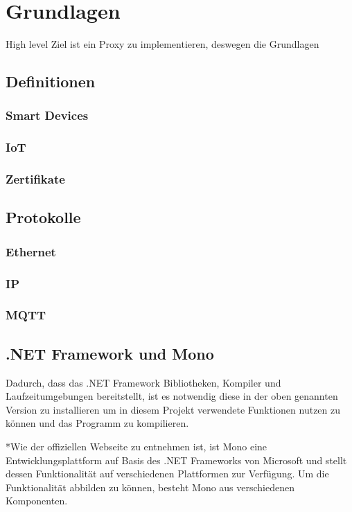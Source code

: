 \chapter{Grundlagen}
High level Ziel ist ein Proxy zu implementieren, deswegen die Grundlagen

\section{Definitionen}
    \subsection{Smart Devices}
    \subsection{IoT}
    \subsection{Zertifikate} %

\section{Protokolle}
    \subsection{Ethernet}
    \subsection{IP}
    \subsection{MQTT}

\section{.NET Framework und Mono}
    Dadurch, dass das .NET Framework Bibliotheken, Kompiler und Laufzeitumgebungen bereitstellt, ist es notwendig diese in der oben genannten Version zu installieren um in diesem Projekt verwendete Funktionen nutzen zu können und das Programm zu kompilieren.
    
    *Wie der offiziellen Webseite \cite{mono_project_2018} zu entnehmen ist, ist Mono eine Entwicklungsplattform auf Basis des .NET Frameworks von Microsoft und stellt dessen Funktionalität auf verschiedenen Plattformen zur Verfügung. Um die Funktionalität abbilden zu können, besteht Mono aus verschiedenen Komponenten.
    
